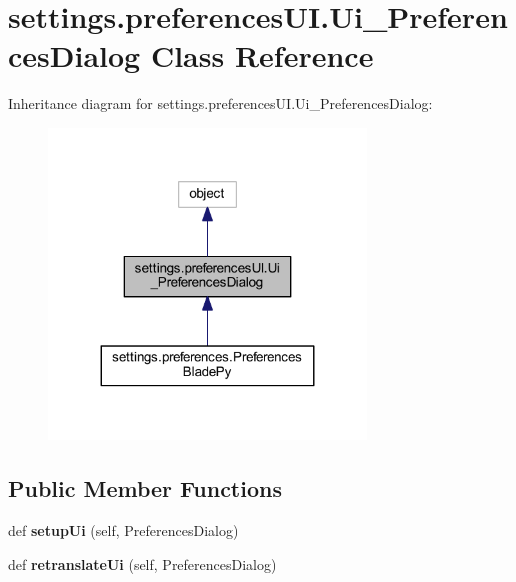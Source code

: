 \hypertarget{a00113}{}\section{settings.\+preferences\+U\+I.\+Ui\+\_\+\+Preferences\+Dialog Class Reference}
\label{a00113}


Inheritance diagram for settings.\+preferences\+U\+I.\+Ui\+\_\+\+Preferences\+Dialog\+:
\nopagebreak
\begin{figure}[H]
\begin{center}
\leavevmode
\includegraphics[width=239pt]{a00112}
\end{center}
\end{figure}
\subsection*{Public Member Functions}
\begin{DoxyCompactItemize}
\item 
\hypertarget{a00113_a61eadae581e6b31932e65f89ee78760c}{}\label{a00113_a61eadae581e6b31932e65f89ee78760c} 
def {\bfseries setup\+Ui} (self, Preferences\+Dialog)
\item 
\hypertarget{a00113_a29096d3ca31a6d880f3e4680987243e8}{}\label{a00113_a29096d3ca31a6d880f3e4680987243e8} 
def {\bfseries retranslate\+Ui} (self, Preferences\+Dialog)
\end{DoxyCompactItemize}
